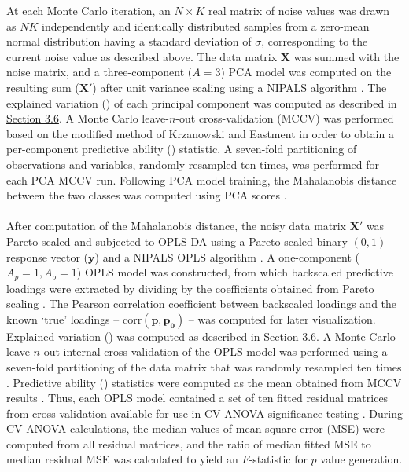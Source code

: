 \begin{doublespace}
At each Monte Carlo iteration, an $N \times K$ real matrix of noise values was
drawn as $NK$ independently and identically distributed samples from a
zero-mean normal distribution having a standard deviation of $\sigma$,
corresponding to the current noise value as described above. The data matrix
$\mathbf{X}$ was summed with the noise matrix, and a three-component ($A = 3$)
PCA model was computed on the resulting sum ($\mathbf{X'}$) after unit variance
scaling \cite{vandenberg:bmcg2006} using a NIPALS algorithm
\cite{jolliffe2002}. The explained variation (\rsq{}) of each principal
component was computed as described in \hyperlink{section.3.6}{Section 3.6}.
A Monte Carlo leave-$n$-out cross-validation (MCCV) was performed based on the
modified method of Krzanowski and Eastment \cite{eshghi:cils2014} in order to
obtain a per-component predictive ability (\qsq{}) statistic. A seven-fold
partitioning of observations and variables, randomly resampled ten times, was
performed for each PCA MCCV run. Following PCA model training, the Mahalanobis
distance between the two classes was computed using PCA scores
\cite{demaesschalck:cils2000}.
\\\\
After computation of the Mahalanobis distance, the noisy data matrix
$\mathbf{X'}$ was Pareto-scaled and subjected to OPLS-DA using a Pareto-scaled
binary $(0,1)$ response vector ($\mathbf{y}$) and a NIPALS OPLS algorithm
\cite{trygg:jchemo2002}. A one-component ($A_p = 1, A_o = 1$) OPLS model was
constructed, from which backscaled predictive loadings were extracted by
dividing by the coefficients obtained from Pareto scaling
\cite{cloarec:anchem2005b}. The Pearson correlation coefficient between
backscaled loadings and the known `true' loadings --
$\mathrm{corr}(\mathbf{p},\mathbf{p_0})$ -- was computed for later
visualization. Explained variation (\rsqy{}) was computed as described in
\hyperlink{section.3.6}{Section 3.6}. A Monte Carlo leave-$n$-out internal
cross-validation of the OPLS model was performed using a seven-fold
partitioning of the data matrix that was randomly resampled ten times
\cite{xu:cils2001}. Predictive ability (\dqsq{}) statistics were computed as
the mean \dqsq{} obtained from MCCV results \cite{westerhuis:metab2008b}.
Thus, each OPLS model contained a set of ten fitted residual matrices from
cross-validation available for use in CV-ANOVA significance testing
\cite{eriksson:jchemo2008}. During CV-ANOVA calculations, the median values
of mean square error (MSE) were computed from all residual matrices, and the
ratio of median fitted MSE to median residual MSE was calculated to yield an
$F$-statistic for $p$ value generation.
\end{doublespace}

